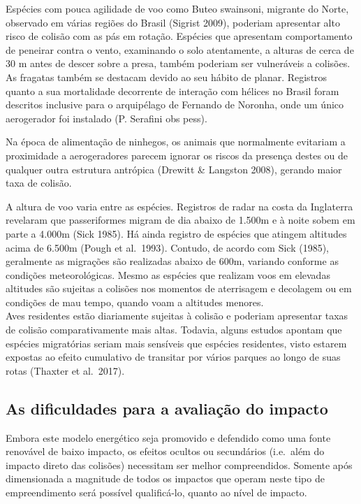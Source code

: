 \documentclass[
]{scrbook}
\begin{document}
Espécies com pouca agilidade de voo como Buteo swainsoni, migrante do Norte, observado em várias regiões do Brasil (Sigrist 2009), poderiam apresentar alto risco de colisão com as pás em rotação. Espécies que apresentam comportamento de peneirar contra o vento, examinando o solo atentamente, a alturas de cerca de 30 m antes de descer sobre a presa, também poderiam ser vulneráveis a colisões. As fragatas também se destacam devido ao seu hábito de planar. Registros quanto a sua mortalidade decorrente de interação com hélices no Brasil foram descritos inclusive para o arquipélago de Fernando de Noronha, onde um único aerogerador foi instalado (P. Serafini obs pess).

Na época de alimentação de ninhegos, os animais que normalmente evitariam a proximidade a aerogeradores parecem ignorar os riscos da presença destes ou de qualquer outra estrutura antrópica (Drewitt \& Langston 2008), gerando maior taxa de colisão.

A altura de voo varia entre as espécies. Registros de radar na costa da Inglaterra revelaram que passeriformes migram de dia abaixo de 1.500m e à noite sobem em parte a 4.000m (Sick 1985). Há ainda registro de espécies que atingem altitudes acima de 6.500m (Pough et al.~1993). Contudo, de acordo com Sick (1985), geralmente as migrações são realizadas abaixo de 600m, variando conforme as condições meteorológicas. Mesmo as espécies que realizam voos em elevadas altitudes são sujeitas a colisões nos momentos de aterrisagem e decolagem ou em condições de mau tempo, quando voam a altitudes menores.\\
Aves residentes estão diariamente sujeitas à colisão e poderiam apresentar taxas de colisão comparativamente mais altas. Todavia, alguns estudos apontam que espécies migratórias seriam mais sensíveis que espécies residentes, visto estarem expostas ao efeito cumulativo de transitar por vários parques ao longo de suas rotas (Thaxter et al.~2017).

\hypertarget{as-dificuldades-para-a-avaliauxe7uxe3o-do-impacto}{%
\subsection{As dificuldades para a avaliação do impacto}\label{as-dificuldades-para-a-avaliauxe7uxe3o-do-impacto}}

Embora este modelo energético seja promovido e defendido como uma fonte renovável de baixo impacto, os efeitos ocultos ou secundários (i.e.~além do impacto direto das colisões) necessitam ser melhor compreendidos. Somente após dimensionada a magnitude de todos os impactos que operam neste tipo de empreendimento será possível qualificá-lo, quanto ao nível de impacto.
\end{document}
